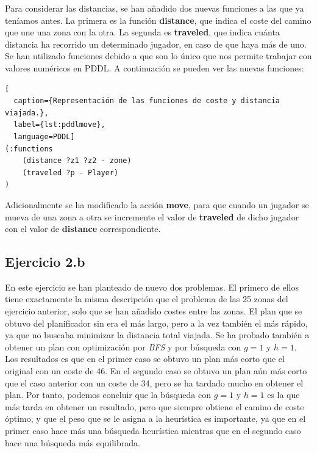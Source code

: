 \documentclass[11pt,a4paper]{article}
\begin{document}
Para considerar las distancias, se han añadido dos nuevas funciones a las que ya teníamos antes. La primera es la función
\textbf{distance}, que indica el coste del camino que une una zona con la otra. La segunda es \textbf{traveled}, que indica
cuánta distancia ha recorrido un determinado jugador, en caso de que haya más de uno. Se han utilizado funciones debido a que
son lo único que nos permite trabajar con valores numéricos en PDDL. A continuación se pueden ver las nuevas funciones:

\begin{algorithm}[H]
\begin{lstlisting}[
  caption={Representación de las funciones de coste y distancia viajada.},
  label={lst:pddlmove},
  language=PDDL]
(:functions
    (distance ?z1 ?z2 - zone)
    (traveled ?p - Player)
)
\end{lstlisting}
\end{algorithm}

Adicionalmente se ha modificado la acción \textbf{move}, para que cuando un jugador se mueva de una zona a otra se incremente el
valor de \textbf{traveled} de dicho jugador con el valor de \textbf{distance} correspondiente.

\subsection{Ejercicio 2.b}

En este ejercicio se han planteado de nuevo dos problemas. El primero de ellos tiene exactamente la misma descripción que el problema
de las 25 zonas del ejercicio anterior, solo que se han añadido costes entre las zonas. El plan que se obtuvo del planificador sin
era el más largo, pero a la vez también el más rápido, ya que no buscaba minimizar la distancia total viajada. Se ha probado también a
obtener un plan con optimización por \textit{BFS} y por búsqueda con $g = 1$ y $h = 1$. Los resultados es que en el primer caso se
obtuvo un plan más corto que el original con un coste de 46. En el segundo caso se obtuvo un plan aún más corto que el caso anterior
con un coste de 34, pero se ha tardado mucho en obtener el plan. Por tanto, podemos concluir que la búsqueda con $g = 1$ y $h = 1$ es
la que más tarda en obtener un resultado, pero que siempre obtiene el camino de coste óptimo, y que el peso que se le asigna a la
heurística es importante, ya que en el primer caso hace más una búsqueda heurística mientras que en el segundo caso hace una búsqueda
más equilibrada.
\end{document}
